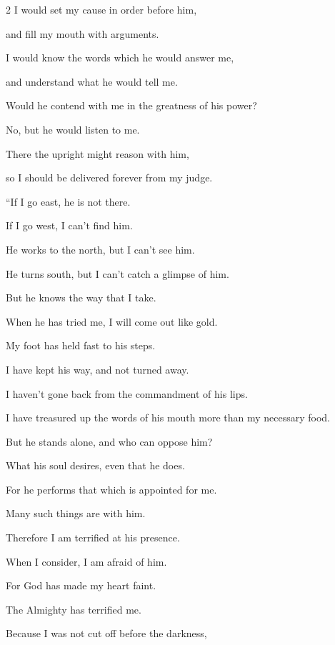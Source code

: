 \begin{multicols}{2}
	\myverse{}I would set my cause in order before him,
	
	and fill my mouth with arguments.
	
	\myverse{}I would know the words which he would answer me,
	
	and understand what he would tell me.
	
	\myverse{}Would he contend with me in the greatness of his power?
	
	No, but he would listen to me.
	
	\myverse{}There the upright might reason with him,
	
	so I should be delivered forever from my judge.
	
		\vspace{\baselineskip}
	
	\myverse{}“If I go east, he is not there.
	
	If I go west, I can’t find him.
	
	\myverse{}He works to the north, but I can’t see him.
	
	He turns south, but I can’t catch a glimpse of him.
	
		\vspace{\baselineskip}
	
	\myverse{}But he knows the way that I take.
	
	When he has tried me, I will come out like gold.
	
	\myverse{}My foot has held fast to his steps.
	
	I have kept his way, and not turned away.
	
	\myverse{}I haven’t gone back from the commandment of his lips.
	
	I have treasured up the words of his mouth more than my necessary food.
	
	\myverse{}But he stands alone, and who can oppose him?
	
	What his soul desires, even that he does.
	
	\myverse{}For he performs that which is appointed for me.
	
	Many such things are with him.
	
	\myverse{}Therefore I am terrified at his presence.
	
	When I consider, I am afraid of him.
	
	\myverse{}For God has made my heart faint.
	
	The Almighty has terrified me.
	
	\myverse{}Because I was not cut off before the darkness,
	

\end{multicols}
